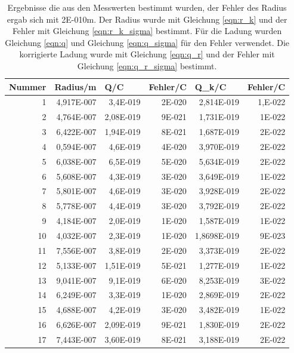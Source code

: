 \documentclass[12pt]{scrartcl}
\begin{document}
\begin{table}[H]
\caption{Ergebnisse die aus den Messwerten bestimmt wurden, der Fehler des Radius ergab sich mit 2E-010m. Der Radius wurde mit Gleichung \ref{eqn:r_k} und der Fehler mit Gleichung \ref{eqn:r_k_sigma} bestimmt. Für die Ladung wurden Gleichung \ref{eqn:q} und Gleichung \ref{eqn:q_sigma} für den Fehler verwendet. Die korrigierte Ladung wurde mit Gleichung \ref{eqn:q_r} und der Fehler mit Gleichung \ref{eqn:q_r_sigma} bestimmt.}
\begin{center}
\begin{tabular}{|r|r|r|r|r|r|}
\hline
\multicolumn{1}{|l|}{Nummer} & \multicolumn{1}{|l|}{Radius/m} & \multicolumn{1}{l|}{Q/C} & \multicolumn{1}{l|}{Fehler/C} & \multicolumn{1}{l|}{Q\_k/C} & \multicolumn{1}{l|}{Fehler/C} \\ \hline
1 & 4,917E-007 & 3,4E-019 & 2E-020 & 2,814E-019 & 1,E-022 \\ \hline
2 & 4,764E-007 & 2,08E-019 & 9E-021 & 1,731E-019 & 1E-022 \\ \hline
3 & 6,422E-007 & 1,94E-019 & 8E-021 & 1,687E-019 & 2E-022 \\ \hline
4 & 0,594E-007 & 4,6E-019 & 4E-020 & 3,970E-019 & 2E-022 \\ \hline
5 & 6,038E-007 & 6,5E-019 & 5E-020 & 5,634E-019 & 2E-022 \\ \hline
6 & 5,608E-007 & 4,3E-019 & 3E-020 & 3,649E-019 & 1E-022 \\ \hline
7 & 5,801E-007 & 4,6E-019 & 3E-020 & 3,928E-019 & 2E-022 \\ \hline
8 & 5,778E-007 & 4,4E-019 & 3E-020 & 3,792E-019 & 2E-022 \\ \hline
9 & 4,184E-007 & 2,0E-019 & 1E-020 & 1,587E-019 & 1E-022 \\ \hline
10 & 4,032E-007 & 2,3E-019 & 1E-020 & 1,8698E-019 & 9E-023 \\ \hline
11 & 7,556E-007 & 3,8E-019 & 2E-020 & 3,373E-019 & 2E-022 \\ \hline
12 & 5,133E-007 & 1,51E-019 & 5E-021 & 1,277E-019 & 1E-022 \\ \hline
13 & 9,041E-007 & 9,1E-019 & 6E-020 & 8,253E-019 & 3E-022 \\ \hline
14 & 6,249E-007 & 3,3E-019 & 1E-020 & 2,869E-019 & 2E-022 \\ \hline
15 & 4,688E-007 & 4,2E-019 & 3E-020 & 3,482E-019 & 1E-022 \\ \hline
16 & 6,626E-007 & 2,09E-019 & 9E-021 & 1,830E-019 & 2E-022 \\ \hline
17 & 7,443E-007 & 3,60E-019 & 8E-021 & 3,188E-019 & 2E-022 \\ \hline

\end{tabular}
\end{center}
\end{table}
\end{document}
